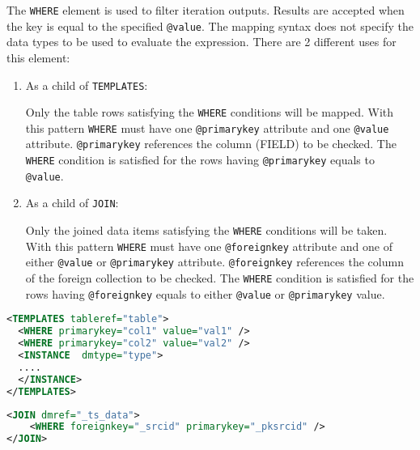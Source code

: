 The \texttt{WHERE} element is used to filter iteration outputs. Results are accepted when the key is equal to the specified \texttt{@value}. The mapping syntax does not specify the data types to be used to evaluate the expression. 
There  are 2 different uses for this element:
\begin{enumerate}
\item{As a child of \texttt{TEMPLATES}:}

  Only the table rows satisfying the \texttt{WHERE} conditions will be mapped. 
  With this pattern \texttt{WHERE} must have one \texttt{@primarykey} attribute and one \texttt{@value} attribute. 
  \texttt{@primarykey} references the column (FIELD) to be checked. 
  The \texttt{WHERE} condition is satisfied for the rows having \texttt{@primarykey} equals to \texttt{@value}.
             
\item{As a child of \texttt{JOIN}:}
      
  Only the joined data items satisfying the \texttt{WHERE} conditions will be taken. 
  With this pattern \texttt{WHERE} must have one \texttt{@foreignkey} attribute and one of either \texttt{@value} or \texttt{@primarykey} attribute. 
  \texttt{@foreignkey} references the column of the foreign collection to be checked. 
  The \texttt{WHERE} condition is satisfied for the rows having \texttt{@foreignkey} equals to either \texttt{@value} or \texttt{@primarykey} value.

\end{enumerate}

\begin{lstlisting}[caption={\texttt{WHERE} Example: only rows having \texttt{val1} as \texttt{col1} value and  \texttt{val2} as \texttt{col2} value must be mapped.},language=XML]
<TEMPLATES tableref="table">
  <WHERE primarykey="col1" value="val1" />
  <WHERE primarykey="col2" value="val2" />
  <INSTANCE  dmtype="type">
  ....
  </INSTANCE>
</TEMPLATES>
\end{lstlisting}

\begin{lstlisting}[caption={\texttt{WHERE} Example: the join is satisfied when the value of the \texttt{\_pksrcid} column is equal to the \texttt{\_srcid} column of the foreign table (see \ref{WHERE_snippet}). },language=XML]
<JOIN dmref="_ts_data">
    <WHERE foreignkey="_srcid" primarykey="_pksrcid" />
</JOIN>
\end{lstlisting}

